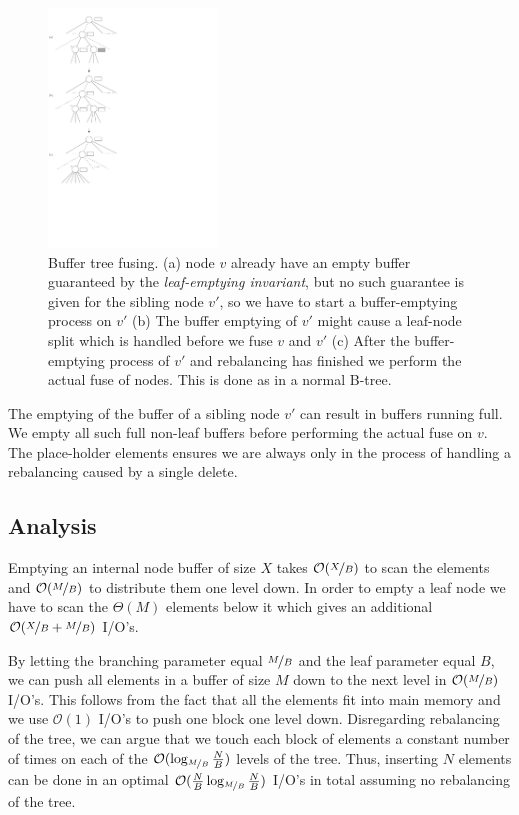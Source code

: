 \documentclass[twoside,11pt,openright]{report}
\begin{document}
\begin{figure}[H]
	\centering
	\includegraphics[width=0.4\textwidth]{../figures/buffer_tree_fuse}
	\caption{Buffer tree fusing. (a) node $v$ already have an empty buffer guaranteed by the \textit{leaf-emptying invariant}, but no such guarantee is given for the sibling node $v'$, so we have to start a buffer-emptying process on $v'$ (b) The buffer emptying of $v'$ might cause a leaf-node split which is handled before we fuse $v$ and $v'$ (c) After the buffer-emptying process of $v'$ and rebalancing has finished we perform the actual fuse of nodes. This is done as in a normal B-tree.}
	\label{fig:buffer_tree_fuse}
\end{figure}

The emptying of the buffer of a sibling node $v'$ can result in buffers running full. We empty all such full non-leaf buffers before performing the actual fuse on $v$. The place-holder elements ensures we are always only in the process of handling a rebalancing caused by a single delete.

\subsection{Analysis}
Emptying an internal node buffer of size $X$ takes $\mathcal{O}(\nicefrac{X}{B})$ to scan the elements and $\mathcal{O}(\nicefrac{M}{B})$ to distribute them one level down. In order to empty a leaf node we have to scan the $\Theta(M)$ elements below it which gives an additional $\mathcal{O}(\nicefrac{X}{B} + \nicefrac{M}{B})$ I/O's.

By letting the branching parameter equal $\nicefrac{M}{B}$ and the leaf parameter equal $B$, we can push all elements in a buffer of size $M$ down to the next level in $\mathcal{O}(\nicefrac{M}{B})$ I/O's. This follows from the fact that all the elements fit into main memory and we use $\mathcal{O}(1)$ I/O's to push one block one level down. Disregarding rebalancing of the tree, we can argue that we touch each block of elements a constant number of times on each of the $\mathcal{O}(\log_{\nicefrac{M}{B}} \frac{N}{B})$ levels of the tree. Thus, inserting $N$ elements can be done in an optimal $\mathcal{O}(\frac{N}{B} \log_{\nicefrac{M}{B}} \frac{N}{B})$ I/O's in total assuming no rebalancing of the tree.
\end{document}
